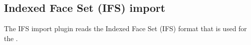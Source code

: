 
\subsection{Indexed Face Set (IFS) import}

The IFS import plugin reads the Indexed Face Set (IFS) format that is
used for the .



